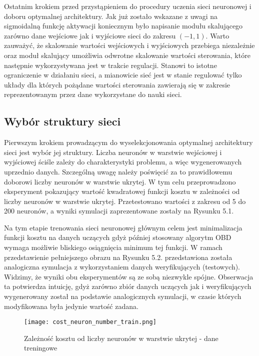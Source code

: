 \par Ostatnim krokiem przed przystąpieniem do procedury uczenia sieci neuronowej i doboru optymalnej architektury. Jak już zostało wskazane z uwagi na sigmoidalną funkcję aktywacji koniecznym było napisanie modułu skalującego zarówno dane wejściowe jak i wyjściowe sieci do zakresu \( (-1,1) \). Warto zauważyć, że skalowanie wartości wejściowych i wyjściowych przebiega niezależnie oraz moduł skalujący umożliwia odwrotne skalowanie wartości sterowania, które następnie wykorzystywana jest w trakcie regulacji. Stanowi to istotne ograniczenie w działaniu sieci, a mianowicie sieć jest w stanie regulować tylko układy dla których pożądane wartości sterowania zawierają się w zakresie reprezentowanym przez dane wykorzystane do nauki sieci.  

\subsection{Wybór struktury sieci}
Pierwszym krokiem prowadzącym do wyselekcjonowania optymalnej architektury sieci jest wybór jej struktury. Liczba neuronów w warstwie wejściowej i wyjściowej ściśle zależy do charakterystyki problemu, a więc wygenerowanych uprzednio danych. Szczególną uwagę należy poświęcić za to prawidłowemu doborowi liczby neuronów w warstwie ukrytej. W tym celu przeprowadzono eksperyment pokazujący wartość kwadratowej funkcji kosztu w zależności od liczby neuronów w warstwie ukrytej. Przetestowano wartości z zakresu od 5 do 200 neuronów, a wyniki symulacji zaprezentowane zostały na Rysunku 5.1. 
\par Na tym etapie trenowania sieci neuronowej głównym celem jest minimalizacja funkcji kosztu na danych uczących gdyż później stosowany algorytm OBD wymaga możliwie bliskiego osiągnięcia minimum tej funkcji. W ramach przedstawienie pełniejszego obrazu na Rysunku 5.2. przedstawiona została analogiczna symulacja z wykorzystaniem danych weryfikujących (testowych). Widzimy, że wyniki obu eksperymentów są ze sobą niezwykle spójne. Obserwacja ta potwierdza intuicję, gdyż zarówno zbiór danych uczących jak i weryfikujących wygenerowany został na podstawie analogicznych symulacji, w czasie których modyfikowana była jedynie wartość zadana. 

\begin{figure}[!h]
  \label{fig:Koszt-liczba-neuronow-treningowe}
  \centering \texttt{[image: cost\_neuron\_number\_train.png]}
  \caption{Zależność kosztu od liczby neuronów w warstwie ukrytej - dane treningowe}
\end{figure}


